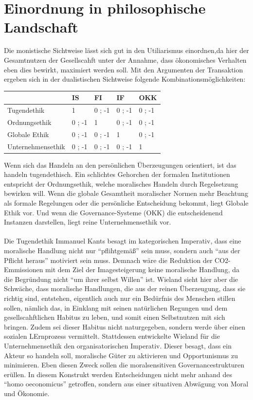 \documentclass[12pt]{article}
\begin{document}
\section{Einordnung in philosophische Landschaft}
Die monistische Sichtweise lässt sich gut in den Utiliarismus einordnen,da hier der Gesamtnutzen der Gesellscahft unter der Annahme, dass ökonomisches Verhalten eben dies bewirkt, maximiert werden soll. Mit den Argumenten der Transaktion ergeben sich in der dualistischen Sichtweise folgende Kombinationsmöglichkeiten:
\begin{center}
\begin{tabular}{|p{4cm}|p{2cm}|p{2cm}|p{2cm}|p{2cm}|}
\hline
 { } & IS & FI & IF & OKK\\\hline
 Tugendethik & 1 & 0 ; -1 & 0 ; -1 & 0 ; -1\\\hline
 Ordnungsethik & 0 ; -1 & 1 & 0 ; -1 & 0 ; -1\\\hline
 Globale Ethik & 0 ; -1 & 0 ; -1 & 1 & 0 ; -1\\\hline
 Unternehmensethik & 0 ; -1 & 0 ; -1 & 0 ; -1 & 1\\\hline
\end{tabular}
\end{center}
Wenn sich das Handeln an den persönlichen Überzeugungen orientiert, ist das handeln tugendethisch. Ein schlichtes Gehorchen der formalen Institutionen entspricht der Ordnungsethik, welche moralisches Handeln durch Regelsetzung bewirken will. Wenn die globale Gesamtheit moralischer Normen mehr Beachtung als formale Regelungen oder die persönliche Entscheidung bekommt, liegt Globale Ethik vor. Und wenn die Governance-Systeme (OKK) die entscheidenend Instanzen darstellen, liegt reine Unternehmensethik vor.\\
\\
Die Tugendethik Immanuel Kants besagt im kategorischen Imperativ, dass eine moralische Handlung nicht nur “pflihtgemäß” sein muss, sondern auch “aus der Pflicht heraus” motiviert sein muss. Demnach wäre die Reduktion der CO2-Emmissionen mit dem Ziel der Imagesteigerung keine moralische Handlung, da die Begründung nicht “um ihrer selbst Willen” ist. Wieland sieht hier aber die Schwäche, dass moralische Handlungen, die aus der reinen Überzeugung, dass sie richtig sind, entstehen, eigentlich auch nur ein Bedürfnis des Menschen stillen sollen, nämlich das, in Einklang mit seinen natürlichen Regungen und dem gesellscahftlichen Habitus zu leben, und somit einen Selbstnutzen mit sich bringen. Zudem sei dieser Habitus nicht naturgegeben, sondern werde über einen sozialen LErnprozess vermittelt. Stattdessen entwickelte Wieland für die Unternehmensethik den organisatorischen Imperativ. Dieser besagt, dass ein Akteur so handeln soll, moralische Güter zu aktivieren und Opportunismus zu minimieren. Eben diesen Zweck sollen die moralsensitiven Governancestrukturen erüllen. In diesem Konstrukt werden Entscheidungen nicht mehr anhand des “homo oeconomicus” getroffen, sondern aus einer situativen Abwägung von Moral und Ökonomie.
\clearpage
\frontmatter%
\renewcommand{\plaintitle}{Literaturverzeichnis}
\setcounter{page}{5}
\printMyBibliography
\end{document}
